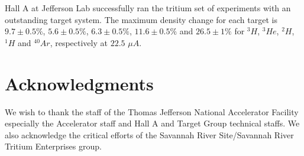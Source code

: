 \documentclass[final,5p,times,twocolumn]{elsarticle}
\begin{document}
Hall A at Jefferson Lab successfully ran the tritium set of experiments with an outstanding target system.  
The maximum density change for each target is $9.7 \pm 0.5 \%$, $5.6 \pm 0.5\% $, $6.3 \pm 0.5\% $, $11.6\pm 0.5\% $ 
and $26.5 \pm 1 \%$ for $^{3}H$, $^{3}He$, $^{2}H$, $^{1}H$ and $^{40}Ar$, respectively at $22.5$ $\mu A$. 

\section{Acknowledgments}

We wish to thank the staff of the Thomas Jefferson National Accelerator Facility especially the Accelerator staff and  Hall A and Target Group technical staffs. We also acknowledge the critical efforts of the Savannah River Site/Savannah River Tritium Enterprises group.


 

\end{document}

